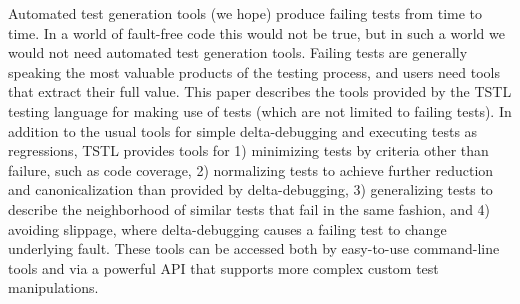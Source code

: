Automated test generation tools (we hope) produce failing tests from time to time.  In a world of fault-free code this would not be true, but in such a world we would not need automated test generation tools.  Failing tests are generally speaking the most valuable products of the testing process, and users need tools that extract their full value.  This paper describes the tools provided by the TSTL testing language for making use of tests (which are not limited to failing tests).  In addition to the usual tools for simple delta-debugging and executing tests as regressions, TSTL provides tools for 1) minimizing tests by criteria other than failure, such as code coverage, 2) normalizing tests to achieve further reduction and canonicalization than provided by delta-debugging, 3) generalizing tests to describe the neighborhood of similar tests that fail in the same fashion, and 4) avoiding slippage, where delta-debugging causes a failing test to change underlying fault.  These tools can be accessed both by easy-to-use command-line tools and via a powerful API that supports more complex custom test manipulations.